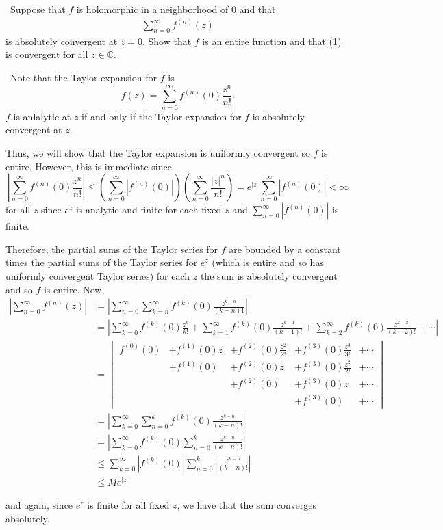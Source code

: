 \documentclass[12pt]{Homework}
\begin{document}
\begin{problem} $\,$
Suppose that $f$ is holomorphic in a neighborhood of $0$ and that \begin{align*}
    \sum_{n=0}^\infty f^{(n)}(z) \tag{1}
\end{align*} is absolutely convergent at $z=0$. Show that $f$ is an entire function and that (1) is convergent for all $z\in\mathbb{C}$.
\end{problem}


\begin{solution}$\,$
Note that the Taylor expansion for $f$ is $$f(z)=\sum_{n=0}^\infty f^{(n)}(0)\frac{z^n}{n!}.$$ $f$ is anlalytic at $z$ if and only if the Taylor expansion for $f$ is absolutely convergent at $z.$

Thus, we will show that the Taylor expansion is uniformly convergent so $f$ is entire. However, this is immediate since $$\left|\sum_{n=0}^\infty f^{(n)}(0)\frac{z^n}{n!}\right|\le\left(\sum_{n=0}^\infty|f^{(n)}(0)|\right)\left(\sum_{n=0}^\infty\frac{|z|^n}{n!}\right)=e^{|z|}\sum_{n=0}^\infty|f^{(n)}(0)|<\infty$$ for all $z$ since $e^z$ is analytic and finite for each fixed $z$ and $\sum_{n=0}^\infty|f^{(n)}(0)|$ is finite.

Therefore, the partial sums of the Taylor series for $f$ are bounded by a constant times the partial sums of the Taylor series for $e^z$ (which is entire and so has uniformly convergent Taylor series) for each $z$ the sum is absolutely convergent and so $f$ is entire. Now, \begin{align*}
    \left|\sum_{n=0}^\infty f^{(n)}(z)\right|&=\left|\sum_{n=0}^\infty\sum_{k=n}^\infty f^{(k)}(0)\frac{z^{k-n}}{(k-n)1}\right|\\
    &=\left|\sum_{k=0}^\infty f^{(k)}(0)\frac{z^k}{k!}+\sum_{k=1}^\infty f^{(k)}(0)\frac{z^{k-1}}{(k-1)!}+\sum_{k=2}^\infty f^{(k)}(0)\frac{z^{k-2}}{(k-2)!}+\cdots\right|\\
    &=\begin{vmatrix}
    f^{(0)}(0) & + f^{(1)}(0)z & + f^{(2)}(0)\frac{z^2}{2!} & + f^{(3)}(0)\frac{z^3}{3!} &+\cdots\\
    & + f^{(1)}(0) & + f^{(2)}(0)z & + f^{(3)}(0)\frac{z^2}{2!} & +\cdots\\
    & & +f^{(2)}(0) & + f^{(3)}(0)z &+\cdots \\
    & & & + f^{(3)}(0) & +\cdots
    \end{vmatrix}\\
    &=\left|\sum_{k=0}^\infty\sum_{n=0}^kf^{(k)}(0)\frac{z^{k-n}}{(k-n)!}\right|\\
    &=\left|\sum_{k=0}^\infty f^{(k)}(0)\sum_{n=0}^k\frac{z^{k-n}}{(k-n)!}\right|\\
    &\le \sum_{k=0}^\infty|f^{(k)}(0)|\sum_{n=0}^k\left|\frac{z^{k-n}}{(k-n)!}\right|\\
    &\le M e^{|z|}
\end{align*}

and again, since $e^z$ is finite for all fixed $z$, we have that the sum converges absolutely.
\end{solution}
\newpage
\end{document}
